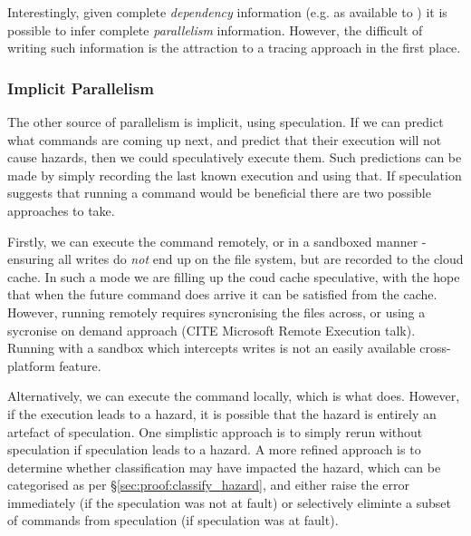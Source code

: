 Interestingly, given complete \emph{dependency} information (e.g. as available to \Make) it is possible to infer complete \emph{parallelism} information. However, the difficult of writing such information is the attraction to a tracing approach in the first place.

\subsubsection{Implicit Parallelism}

The other source of parallelism is implicit, using speculation. If we can predict what commands are coming up next, and predict that their execution will not cause hazards, then we could speculatively execute them. Such predictions can be made by simply recording the last known execution and using that. If speculation suggests that running a command would be beneficial there are two possible approaches to take.

Firstly, we can execute the command remotely, or in a sandboxed manner - ensuring all writes do \emph{not} end up on the file system, but are recorded to the cloud cache. In such a mode we are filling up the coud cache speculative, with the hope that when the future command does arrive it can be satisfied from the cache. However, running remotely requires syncronising the files across, or using a sycronise on demand approach (CITE Microsoft Remote Execution talk). Running with a sandbox which intercepts writes is not an easily available cross-platform feature.

Alternatively, we can execute the command locally, which is what \Rattle does. However, if the execution leads to a hazard, it is possible that the hazard is entirely an artefact of speculation. One simplistic approach is to simply rerun without speculation if speculation leads to a hazard. A more refined approach is to determine whether classification may have impacted the hazard, which can be categorised as per \S\ref{sec:proof:classify_hazard}, and either raise the error immediately (if the speculation was not at fault) or selectively eliminte a subset of commands from speculation (if speculation was at fault).
